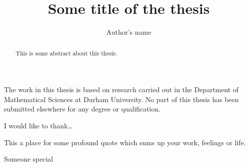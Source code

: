 \documentclass[frontopenright,draft,twoside,openright]{dmathesis}
\begin{document}
\title{Some title of the thesis}
\author{Author's name}
\maketitlepage*

\begin{abstract}
%
	This is some abstract about this thesis.
%
\end{abstract}

\begin{declaration*}
%
	The work in this thesis is based on research carried out in the Department of
	Mathematical Sciences at Durham University. No part of this thesis has been
	submitted elsewhere for any degree or qualification.
%
\end{declaration*}

\begin{acknowledgements*}
%
	I would like to thank\ldots
%
\end{acknowledgements*}

\begin{epigraph*}
%
	This a place for some profound quote which sums up your work, feelings or
	life.
%
\end{epigraph*}

\begin{dedication*}
%
	Someone special
%
\end{dedication*}

\disableprotrusion
\tableofcontents*
\listoffigures
\listoftables
\enableprotrusion

\cleardoublepage
{}

%
%
%
%
%

\appendix
%
%

\nocite{*}
\printbibliography[heading=bibintoc]
\end{document}
